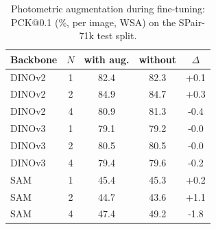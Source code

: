 \begin{table}[t]
\centering
\caption{Photometric augmentation during fine-tuning: PCK@0.1 (\%, per image, WSA) on the SPair-71k test split.}
\label{tab:aug}
\small
\begin{tabular}{lcccc}
\toprule
Backbone & $N$ & with aug. & without & $\Delta$ \\
\midrule
DINOv2 & 1 & 82.4 & 82.3 & +0.1 \\
DINOv2 & 2 & 84.9 & 84.7 & +0.3 \\
DINOv2 & 4 & 80.9 & 81.3 & -0.4 \\
DINOv3 & 1 & 79.1 & 79.2 & -0.0 \\
DINOv3 & 2 & 80.5 & 80.5 & -0.0 \\
DINOv3 & 4 & 79.4 & 79.6 & -0.2 \\
SAM & 1 & 45.4 & 45.3 & +0.2 \\
SAM & 2 & 44.7 & 43.6 & +1.1 \\
SAM & 4 & 47.4 & 49.2 & -1.8 \\
\bottomrule
\end{tabular}
\end{table}
